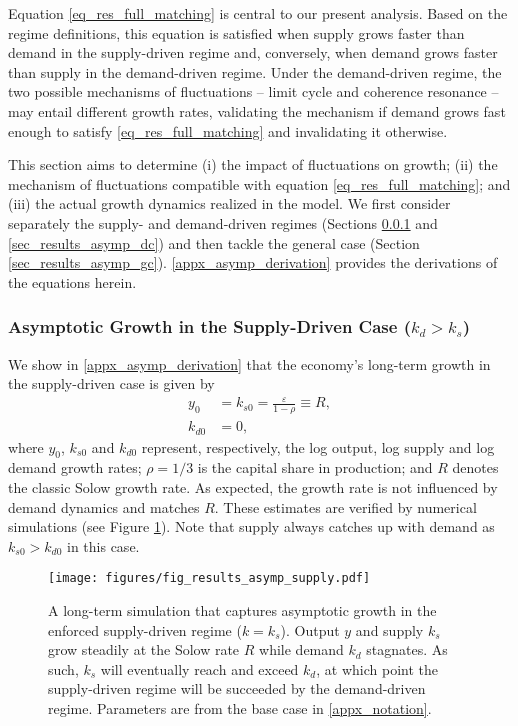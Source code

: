 \documentclass[authoryear, review]{elsarticle}
\begin{document}
Equation \eqref{eq_res_full_matching} is central to our present analysis. Based on the regime definitions, this equation is satisfied when supply grows faster than demand in the supply-driven regime and, conversely, when demand grows faster than supply in the demand-driven regime. Under the demand-driven regime, the two possible mechanisms of fluctuations -- limit cycle and coherence resonance -- may entail different growth rates, validating the mechanism if demand grows fast enough to satisfy \eqref{eq_res_full_matching} and invalidating it otherwise. 

This section aims to determine (i) the impact of fluctuations on growth; (ii) the mechanism of fluctuations compatible with equation \eqref{eq_res_full_matching}; and (iii) the actual growth dynamics realized in the model. We first consider separately the supply- and demand-driven regimes (Sections \ref{sec_results_asymp_sc} and \ref{sec_results_asymp_dc}) and then tackle the general case (Section \ref{sec_results_asymp_gc}). \ref{appx_asymp_derivation} provides the derivations of the equations herein.

\subsubsection{Asymptotic Growth in the Supply-Driven Case ($k_d>k_s$)}\label{sec_results_asymp_sc}

We show in \ref{appx_asymp_derivation} that the economy's long-term growth in the supply-driven case is given by
\begin{align}\label{eq_asympotitc_prod_supply}
	y_0 &= k_{s0} = \frac{\varepsilon}{1-\rho} \equiv R,\\
    k_{d0} &= 0,
\end{align}
where $y_0$, $k_{s0}$ and $k_{d0}$ represent, respectively, the log output, log supply and log demand growth rates; $\rho=1/3$ is the capital share in production; and $R$ denotes the classic Solow growth rate. As expected, the growth rate is not influenced by demand dynamics and matches $R$. These estimates are verified by numerical simulations (see Figure \ref{fig_results_asymp_supply}). Note that supply always catches up with demand as $k_{s0}>k_{d0}$ in this case.

\begin{figure}
    \centering
    \texttt{[image: figures/fig\_results\_asymp\_supply.pdf]}
    \caption{A long-term simulation that captures asymptotic growth in the enforced supply-driven regime ($k=k_s$). Output $y$ and supply $k_s$ grow steadily at the Solow rate $R$ while demand $k_d$ stagnates. As such, $k_s$ will eventually reach and exceed $k_d$, at which point the supply-driven regime will be succeeded by the demand-driven regime. Parameters are from the base case in \ref{appx_notation}.}
    \label{fig_results_asymp_supply}
\end{figure}
\end{document}
